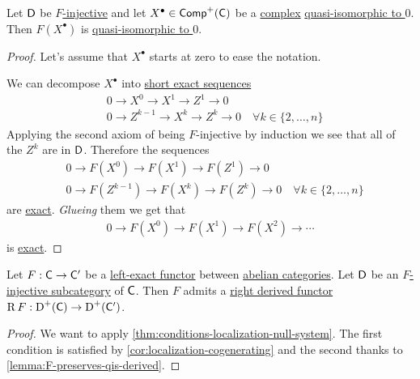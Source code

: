 \documentclass[../../main]{subfiles}
\begin{document}
\begin{lemma}\label{lemma:F-preserves-qis-derived}
  Let \(\category{D}\) be \hyperref[def:F-injective-subcategory]{\(F\)-injective} and let \(X^{\bullet} \in \Complex[+]{\category{C}}\) be a \hyperref[def:complex]{complex} \hyperref[def:quasi-isomorphism]{quasi-isomorphic to \(0\)}.
  Then \(F(X^{\bullet})\) is \hyperref[def:quasi-isomorphism]{quasi-isomorphic to \(0\)}.
\end{lemma}
\begin{proof}
  Let's assume that \(X^{\bullet}\) starts at zero to ease the notation.

  We can decompose \(X^{\bullet}\) into \hyperref[def:short-exact-sequence]{short exact sequences}
  \begin{align*}
    &0 \to X^{0} \to X^{1} \to Z^{1} \to 0 \\
    &0 \to Z^{k-1} \to X^{k} \to Z^{k} \to 0 \quad \forall k \in \{2, \ldots, n\} 
  \end{align*}
  Applying the second axiom of being \(F\)-injective by induction we see that all of the \(Z^{k}\) are in \(\category{D}\).
  Therefore the sequences
  \begin{align*}
    &0 \to F(X^{0}) \to F(X^{1}) \to F(Z^{1}) \to 0 \\
    &0 \to F(Z^{k-1}) \to F(X^{k}) \to F(Z^{k}) \to 0 \quad \forall k \in \{2, \ldots, n\} 
  \end{align*}
  are \hyperref[def:exact-sequence]{exact}.
  \textit{Glueing} them we get that
  \begin{align*}
    0 \to F(X^{0}) \to F(X^{1}) \to F(X^{2}) \to \cdots
  \end{align*}
  is \hyperref[def:exact-sequence]{exact}.
\end{proof}

\begin{theorem}
  Let \(F: \category{C} \to \category{C'}\) be a \hyperref[def:exact-functor]{left-exact functor} between \hyperref[def:abelian-category]{abelian categories}.
  Let \(\category{D}\) be an \hyperref[def:F-injective-subcategory]{\(F\)-injective subcategory} of \(\category{C}\).
  Then \(F\) admits a \hyperref[def:right-derived-functor]{right derived functor} \(\operatorname{R}F: \operatorname{D}^{+}(\category{C}) \to \operatorname{D}^{+}(\category{C'})\).
\end{theorem}
\begin{proof}
  We want to apply \autoref{thm:conditions-localization-null-system}.
  The first condition is satisfied by \autoref{cor:localization-cogenerating} and the second thanks to \autoref{lemma:F-preserves-qis-derived}.
\end{proof}
\end{document}
